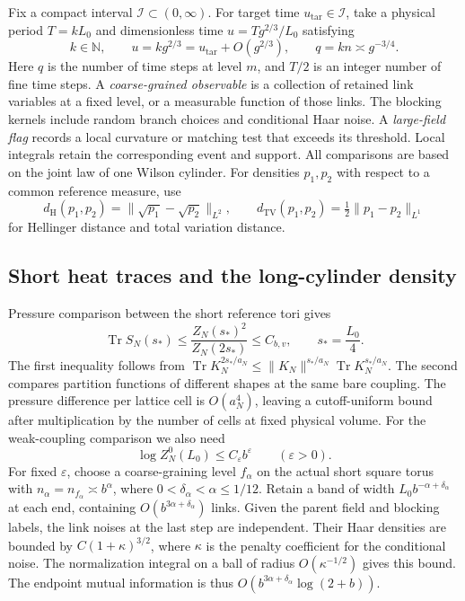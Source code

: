\documentclass[11pt,a4paper]{article}
\numberwithin{equation}{section}
\newcommand{\DTV}{d_{\mathrm{TV}}}
\newcommand{\Tr}{\operatorname{Tr}}
\begin{document}
Fix a compact interval \(\mathcal I\subset(0,\infty)\). For target time \(u_{\mathrm{tar}}\in\mathcal I\), take a physical period \(T=kL_0\) and dimensionless time \(u=Tg^{2/3}/L_0\) satisfying
\begin{equation}
 k\in\mathbb N,\qquad u=kg^{2/3}=u_{\mathrm{tar}}+O(g^{2/3}),\qquad
 q=kn\asymp g^{-3/4}.
 \label{eq:paper-longtime}
\end{equation}
Here \(q\) is the number of time steps at level \(m\), and \(T/2\) is an integer number of fine time steps. A \emph{coarse-grained observable} is a collection of retained link variables at a fixed level, or a measurable function of those links. The blocking kernels include random branch choices and conditional Haar noise. A \emph{large-field flag} records a local curvature or matching test that exceeds its threshold. Local integrals retain the corresponding event and support. All comparisons are based on the joint law of one Wilson cylinder. For densities \(p_1,p_2\) with respect to a common reference measure, use
\[
 d_{\mathrm H}(p_1,p_2)=\|\sqrt{p_1}-\sqrt{p_2}\|_{L^2},\qquad
 \DTV(p_1,p_2)=\tfrac12\|p_1-p_2\|_{L^1}
\]
for Hellinger distance and total variation distance.

\subsection{Short heat traces and the long-cylinder density}

Pressure comparison between the short reference tori gives
\begin{equation}
 \Tr S_N(s_*)\le \frac{Z_N(s_*)^2}{Z_N(2s_*)}\le C_{b,v},
 \qquad s_*=\frac{L_0}{4}.
 \label{eq:paper-short-trace}
\end{equation}
The first inequality follows from
\(\Tr K_N^{2s_*/a_N}\le \|K_N\|^{s_*/a_N}\Tr K_N^{s_*/a_N}\).
The second compares partition functions of different shapes at the same bare coupling. The pressure difference per lattice cell is \(O(a_N^4)\), leaving a cutoff-uniform bound after multiplication by the number of cells at fixed physical volume. For the weak-coupling comparison we also need
\begin{equation}
  \log Z_N^0(L_0)\le C_\varepsilon b^\varepsilon\qquad(\varepsilon>0).
 \label{eq:paper-short-entropy}
\end{equation}
For fixed \(\varepsilon\), choose a coarse-graining level \(f_\alpha\) on the actual short square torus with \(n_\alpha=n_{f_\alpha}\asymp b^\alpha\), where \(0<\delta_\alpha<\alpha\le1/12\). Retain a band of width \(L_0b^{-\alpha+\delta_\alpha}\) at each end, containing \(O(b^{3\alpha+\delta_\alpha})\) links. Given the parent field and blocking labels, the link noises at the last step are independent. Their Haar densities are bounded by \(C(1+\kappa)^{3/2}\), where \(\kappa\) is the penalty coefficient for the conditional noise. The normalization integral on a ball of radius \(O(\kappa^{-1/2})\) gives this bound. The endpoint mutual information is thus \(O(b^{3\alpha+\delta_\alpha}\log(2+b))\).
\end{document}
